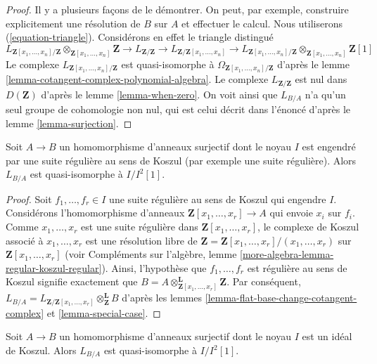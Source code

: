 \begin{proof}
Il y a plusieurs façons de le démontrer. On peut, par exemple, construire
explicitement une résolution de $B$ sur $A$ et effectuer le calcul. Nous
utiliserons (\ref{equation-triangle}). Considérons en effet le triangle
distingué
$$
L_{\mathbf{Z}[x_1, \ldots, x_n]/\mathbf{Z}}
\otimes_{\mathbf{Z}[x_1, \ldots, x_n]} \mathbf{Z} \to
L_{\mathbf{Z}/\mathbf{Z}} \to
L_{\mathbf{Z}/\mathbf{Z}[x_1, \ldots, x_n]}\to
L_{\mathbf{Z}[x_1, \ldots, x_n]/\mathbf{Z}}
\otimes_{\mathbf{Z}[x_1, \ldots, x_n]} \mathbf{Z}[1]
$$
Le complexe $L_{\mathbf{Z}[x_1, \ldots, x_n]/\mathbf{Z}}$ est quasi-isomorphe à
$\Omega_{\mathbf{Z}[x_1, \ldots, x_n]/\mathbf{Z}}$ d'après le lemme
\ref{lemma-cotangent-complex-polynomial-algebra}. Le complexe
$L_{\mathbf{Z}/\mathbf{Z}}$ est nul dans $D(\mathbf{Z})$ d'après le lemme
\ref{lemma-when-zero}. On voit ainsi que $L_{B/A}$ n'a qu'un seul groupe de
cohomologie non nul, qui est celui décrit dans l'énoncé d'après le lemme
\ref{lemma-surjection}.
\end{proof}

\begin{lemma}
\label{lemma-mod-regular-sequence}
Soit $A \to B$ un homomorphisme d'anneaux surjectif dont le noyau $I$ est
engendré par une suite régulière au sens de Koszul (par exemple une suite
régulière). Alors $L_{B/A}$ est quasi-isomorphe à $I/I^2[1]$.
\end{lemma}

\begin{proof}
Soit $f_1, \ldots, f_r \in I$ une suite régulière au sens de Koszul qui
engendre $I$. Considérons l'homomorphisme d'anneaux
$\mathbf{Z}[x_1, \ldots, x_r] \to A$ qui envoie $x_i$ sur $f_i$. Comme
$x_1, \ldots, x_r$ est une suite régulière dans
$\mathbf{Z}[x_1, \ldots, x_r]$, le complexe de Koszul associé à
$x_1, \ldots, x_r$ est une résolution libre de
$\mathbf{Z} = \mathbf{Z}[x_1, \ldots, x_r]/(x_1, \ldots, x_r)$
sur $\mathbf{Z}[x_1, \ldots, x_r]$ (voir Compléments sur l'algèbre, lemme
\ref{more-algebra-lemma-regular-koszul-regular}). Ainsi, l'hypothèse que
$f_1, \ldots, f_r$ est régulière au sens de Koszul signifie exactement que
$B = A \otimes_{\mathbf{Z}[x_1, \ldots, x_r]}^\mathbf{L} \mathbf{Z}$.
Par conséquent,
$L_{B/A} = L_{\mathbf{Z}/\mathbf{Z}[x_1, \ldots, x_r]}
\otimes_\mathbf{Z}^\mathbf{L} B$ d'après les lemmes
\ref{lemma-flat-base-change-cotangent-complex} et \ref{lemma-special-case}.
\end{proof}

\begin{lemma}
\label{lemma-mod-Koszul-regular-ideal}
Soit $A \to B$ un homomorphisme d'anneaux surjectif dont le noyau $I$ est un
idéal de Koszul. Alors $L_{B/A}$ est quasi-isomorphe à $I/I^2[1]$.
\end{lemma}


